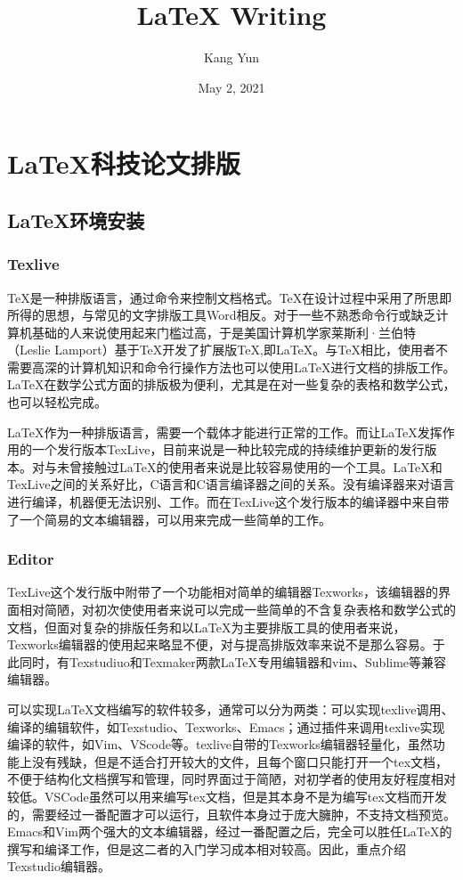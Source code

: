 \documentclass[12pt]{book}
\title{\LaTeX{} Writing}
\author{Kang Yun}
\date{May 2, 2021}
\begin{document}
\maketitle
\frontmatter

\tableofcontents

\part{\LaTeX{}科技论文排版}

\chapter{\LaTeX{}环境安装}

\section{Texlive}

\TeX{}是一种排版语言，通过命令来控制文档格式。\TeX{}在设计过程中采用了所思即所得的思想，与常见的文字排版工具Word相反。对于一些不熟悉命令行或缺乏计算机基础的人来说使用起来门槛过高，于是美国计算机学家莱斯利·兰伯特（Leslie Lamport）基于\TeX{}开发了扩展版\TeX{},即\LaTeX{}。与\TeX{}相比，使用者不需要高深的计算机知识和命令行操作方法也可以使用\LaTeX{}进行文档的排版工作。\LaTeX{}在数学公式方面的排版极为便利，尤其是在对一些复杂的表格和数学公式，也可以轻松完成。

\LaTeX{}作为一种排版语言，需要一个载体才能进行正常的工作。而让\LaTeX{}发挥作用的一个发行版本TexLive，目前来说是一种比较完成的持续维护更新的发行版本。对与未曾接触过\LaTeX{}的使用者来说是比较容易使用的一个工具。\LaTeX{}和TexLive之间的关系好比，C语言和C语言编译器之间的关系。没有编译器来对语言进行编译，机器便无法识别、工作。而在TexLive这个发行版本的编译器中来自带了一个简易的文本编辑器，可以用来完成一些简单的工作。

\section{Editor}

TexLive这个发行版中附带了一个功能相对简单的编辑器Texworks，该编辑器的界面相对简陋，对初次使使用者来说可以完成一些简单的不含复杂表格和数学公式的文档，但面对复杂的排版任务和以\LaTeX{}为主要排版工具的使用者来说，Texworks编辑器的使用起来略显不便，对与提高排版效率来说不是那么容易。于此同时，有Texstudiuo和Texmaker两款\LaTeX{}专用编辑器和vim、Sublime等兼容编辑器。

可以实现\LaTeX{}文档编写的软件较多，通常可以分为两类：可以实现texlive调用、编译的编辑软件，如Texstudio、Texworks、Emacs；通过插件来调用texlive实现编译的软件，如Vim、VScode等。texlive自带的Texworks编辑器轻量化，虽然功能上没有残缺，但是不适合打开较大的文件，且每个窗口只能打开一个tex文档，不便于结构化文档撰写和管理，同时界面过于简陋，对初学者的使用友好程度相对较低。VSCode虽然可以用来编写tex文档，但是其本身不是为编写tex文档而开发的，需要经过一番配置才可以运行，且软件本身过于庞大臃肿，不支持文档预览。Emacs和Vim两个强大的文本编辑器，经过一番配置之后，完全可以胜任\LaTeX{}的撰写和编译工作，但是这二者的入门学习成本相对较高。因此，重点介绍Texstudio编辑器。
\end{document}
